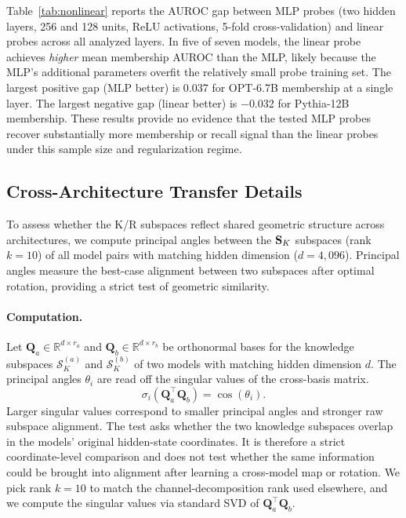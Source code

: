 Table~\ref{tab:nonlinear} reports the AUROC gap between MLP probes (two hidden layers, 256 and 128 units, ReLU activations, 5-fold cross-validation) and linear probes across all analyzed layers.
In five of seven models, the linear probe achieves \emph{higher} mean membership AUROC than the MLP, likely because the MLP's additional parameters overfit the relatively small probe training set.
The largest positive gap (MLP better) is 0.037 for OPT-6.7B membership at a single layer. The largest negative gap (linear better) is $-$0.032 for Pythia-12B membership.
These results provide no evidence that the tested MLP probes recover substantially more membership or recall signal than the linear probes under this sample size and regularization regime.

\subsection{Cross-Architecture Transfer Details}
\label{app:transfer}

To assess whether the K/R subspaces reflect shared geometric structure across architectures, we compute principal angles between the $\mathbf{S}_K$ subspaces (rank $k = 10$) of all model pairs with matching hidden dimension ($d = 4{,}096$).
Principal angles measure the best-case alignment between two subspaces after optimal rotation, providing a strict test of geometric similarity.

\paragraph{Computation.}
Let $\mathbf{Q}_a \in \mathbb{R}^{d \times r_a}$ and $\mathbf{Q}_b \in \mathbb{R}^{d \times r_b}$ be orthonormal bases for the knowledge subspaces $\mathcal{S}_{K}^{(a)}$ and $\mathcal{S}_{K}^{(b)}$ of two models with matching hidden dimension $d$. The principal angles $\theta_i$ are read off the singular values of the cross-basis matrix.
\begin{equation}
\sigma_i\!\left(\mathbf{Q}_a^\top \mathbf{Q}_b\right) = \cos(\theta_i).
\label{eq:principal_angles}
\end{equation}
Larger singular values correspond to smaller principal angles and stronger raw subspace alignment. The test asks whether the two knowledge subspaces overlap in the models' original hidden-state coordinates. It is therefore a strict coordinate-level comparison and does not test whether the same information could be brought into alignment after learning a cross-model map or rotation. We pick rank $k = 10$ to match the channel-decomposition rank used elsewhere, and we compute the singular values via standard SVD of $\mathbf{Q}_a^\top \mathbf{Q}_b$.

